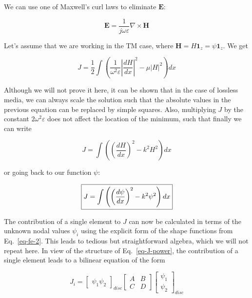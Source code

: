 We can use one of Maxwell's curl laws to eliminate ${\mathbf E}$:

\begin{equation}
{\mathbf E} = \frac{1}{j \omega \varepsilon} \nabla \times {\mathbf H}
\end{equation}  

Let's assume that we are working in the TM case, where ${\mathbf H} = H {\mathbf 1}_z = \psi {\mathbf 1}_z $. We get

\begin{equation}
J = \frac{1}{2} \int \left( \frac{1}{\omega ^2 \varepsilon}\left|{\frac{d H}{d x}}\right|^2 - \mu |H|^2 \right) dx
\end{equation}

Although we will not prove it here, it can be shown that in the case of lossless media, we can always scale the solution such that the absolute values in the previous equation can be replaced by simple squares. Also, multiplying $J$ by the constant $2 \omega ^2 \varepsilon$ does not affect the location of the minimum, such that finally we can write

\begin{equation}
J = \int \left( \left(\frac{d H}{d x}\right)^2 - k^2 H^2 \right) dx
\end{equation}

or going back to our function $\psi$:

\begin{equation}
\fbox{$\displaystyle
J = \int \left( \left(\frac{d \psi}{d x}\right)^2 - k^2 \psi^2 \right) dx \label{eq-J-power}
$}
\end{equation} 

The contribution of a single element to $J$ can now be calculated in terms of the unknown nodal values $\psi_i$ using the explicit form of the shape functions from Eq.~\ref{eq-fe-2}. This leads to tedious but straightforward algebra, which we will not repeat here. In view of the structure of Eq.~\ref{eq-J-power}, the contribution of a single element leads to a bilinear equation of the form

\begin{equation}
J_i = \begin{bmatrix}
\psi_1 \psi_2 
\end{bmatrix}_{disc}
\begin{bmatrix}
A & B \\
C & D 
\end{bmatrix}
\begin{bmatrix}
\psi_1 \\ \psi_2
\end{bmatrix}_{disc}
\label{eq-J-power-i}
\end{equation} 

